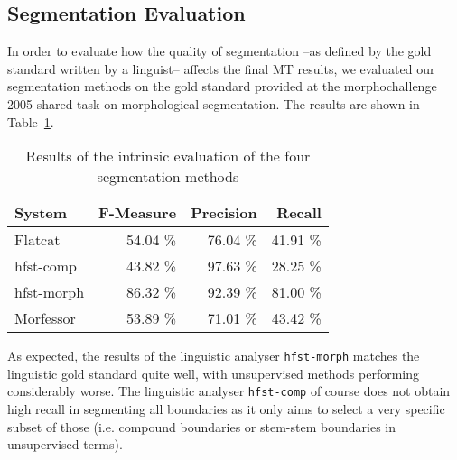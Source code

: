 \documentclass[free]{flammie}
\begin{document}
\subsection{Segmentation Evaluation}\label{subsec:segment-eval}

In order to evaluate how the quality of segmentation --as defined by the gold standard written by a linguist-- affects the final MT results, we evaluated our segmentation methods on the gold standard provided at the morphochallenge 2005 shared task on morphological segmentation.
The results are shown in Table~\ref{table:morph-evaluation}. 


\begin{table}
\scriptsize{
    \centering
    \begin{tabular}{lrrr}
        \hline
        \bf System & \bf F-Measure & \bf Precision & \bf Recall \\
        \hline
        Flatcat &  54.04 \% &  76.04 \% & 41.91 \% \\
        hfst-comp &  43.82 \% &  97.63 \% &  28.25 \% \\
        hfst-morph & 86.32 \% & 92.39 \% & 81.00 \% \\
        Morfessor & 53.89 \% & 71.01 \% & 43.42 \% \\        
        \hline
    \end{tabular}
    \caption{Results of the intrinsic evaluation of the four segmentation methods\label{table:morph-evaluation}}
}
\end{table}

As expected, the results of the linguistic analyser \texttt{hfst-morph} matches the linguistic gold standard quite well, with unsupervised methods performing considerably worse. The linguistic analyser \texttt{hfst-comp} of course does not obtain high recall in segmenting all boundaries as it only aims to select a very specific subset of those (i.e. compound boundaries or stem-stem boundaries in unsupervised terms).
\end{document}
